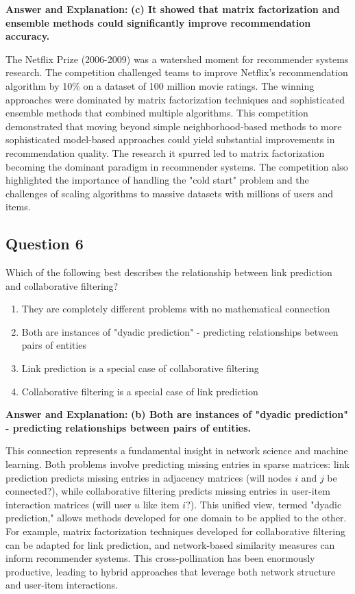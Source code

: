 \documentclass[11pt]{article}
\newenvironment{answer}{\color{answercolor}\begin{framed}\textbf{Answer and Explanation:}}{\end{framed}}
\begin{document}
\begin{answer}
\textbf{(c) It showed that matrix factorization and ensemble methods could significantly improve recommendation accuracy.}

The Netflix Prize (2006-2009) was a watershed moment for recommender systems research. The competition challenged teams to improve Netflix's recommendation algorithm by 10\% on a dataset of 100 million movie ratings. The winning approaches were dominated by matrix factorization techniques and sophisticated ensemble methods that combined multiple algorithms. This competition demonstrated that moving beyond simple neighborhood-based methods to more sophisticated model-based approaches could yield substantial improvements in recommendation quality. The research it spurred led to matrix factorization becoming the dominant paradigm in recommender systems. The competition also highlighted the importance of handling the "cold start" problem and the challenges of scaling algorithms to massive datasets with millions of users and items.
\end{answer}

\subsection{Question 6}
Which of the following best describes the relationship between link prediction and collaborative filtering?

\begin{enumerate}[label=(\alph*)]
\item They are completely different problems with no mathematical connection
\item Both are instances of "dyadic prediction" - predicting relationships between pairs of entities
\item Link prediction is a special case of collaborative filtering
\item Collaborative filtering is a special case of link prediction
\end{enumerate}

\begin{answer}
\textbf{(b) Both are instances of "dyadic prediction" - predicting relationships between pairs of entities.}

This connection represents a fundamental insight in network science and machine learning. Both problems involve predicting missing entries in sparse matrices: link prediction predicts missing entries in adjacency matrices (will nodes $i$ and $j$ be connected?), while collaborative filtering predicts missing entries in user-item interaction matrices (will user $u$ like item $i$?). This unified view, termed "dyadic prediction," allows methods developed for one domain to be applied to the other. For example, matrix factorization techniques developed for collaborative filtering can be adapted for link prediction, and network-based similarity measures can inform recommender systems. This cross-pollination has been enormously productive, leading to hybrid approaches that leverage both network structure and user-item interactions.
\end{answer}
\end{document}
